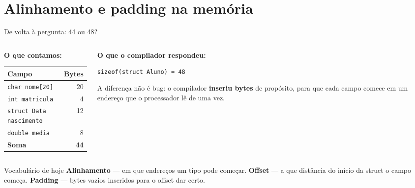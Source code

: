 \documentclass[aspectratio=169]{beamer}
\begin{document}
\section{Alinhamento e padding na memória}

\begin{frame}{De volta à pergunta: 44 ou 48?}
  \begin{columns}[T]
    \begin{column}{0.48\textwidth}
      \textbf{O que contamos:}\\[2mm]
      \small
      \begin{tabular}{lr}
        \toprule
        Campo & Bytes \\
        \midrule
        \texttt{char nome[20]}       & 20 \\
        \texttt{int matricula}       & 4 \\
        \texttt{struct Data nascimento} & 12 \\
        \texttt{double media}        & 8 \\
        \midrule
        \textbf{Soma}                & \textbf{44} \\
        \bottomrule
      \end{tabular}
    \end{column}
    \begin{column}{0.48\textwidth}
      \textbf{O que o compilador respondeu:}\\[2mm]
      \begin{center}
        \texttt{sizeof(struct Aluno) = 48}
      \end{center}
      \vspace{2mm}
      \small
      A diferença não é bug: o compilador \textbf{inseriu bytes} de propósito,
      para que cada campo comece em um endereço que o processador lê de uma vez.
    \end{column}
  \end{columns}
  \begin{block}{Vocabulário de hoje}
    \textbf{Alinhamento} --- em que endereços um tipo pode começar.
    \textbf{Offset} --- a que distância do início da struct o campo começa.
    \textbf{Padding} --- bytes vazios inseridos para o offset dar certo.
  \end{block}
\end{frame}
\end{document}
